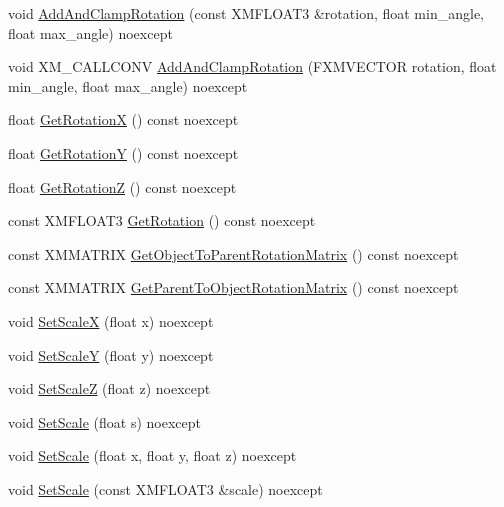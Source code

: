 \begin{DoxyCompactItemize}
\item 
void \hyperlink{structmage_1_1_transform_node_aa36f2d18ac2a1d34815149c8fc6e0eaa}{Add\+And\+Clamp\+Rotation} (const X\+M\+F\+L\+O\+A\+T3 \&rotation, float min\+\_\+angle, float max\+\_\+angle) noexcept
\item 
void X\+M\+\_\+\+C\+A\+L\+L\+C\+O\+NV \hyperlink{structmage_1_1_transform_node_a0dbde9ab6c68d8c3717c2d0f2dd5cc5c}{Add\+And\+Clamp\+Rotation} (F\+X\+M\+V\+E\+C\+T\+OR rotation, float min\+\_\+angle, float max\+\_\+angle) noexcept
\item 
float \hyperlink{structmage_1_1_transform_node_a590d811929ff63f0caa660036b4e74bb}{Get\+RotationX} () const noexcept
\item 
float \hyperlink{structmage_1_1_transform_node_aad37033c32302445a8bc0d93b655dae6}{Get\+RotationY} () const noexcept
\item 
float \hyperlink{structmage_1_1_transform_node_aba94c2995aae387542cd238d1df446f5}{Get\+RotationZ} () const noexcept
\item 
const X\+M\+F\+L\+O\+A\+T3 \hyperlink{structmage_1_1_transform_node_ae785911d718434387199a92c6966a9b7}{Get\+Rotation} () const noexcept
\item 
const X\+M\+M\+A\+T\+R\+IX \hyperlink{structmage_1_1_transform_node_a07d6171d757d2f7fbf0d2d59dbe531d9}{Get\+Object\+To\+Parent\+Rotation\+Matrix} () const noexcept
\item 
const X\+M\+M\+A\+T\+R\+IX \hyperlink{structmage_1_1_transform_node_a6a5c82910f5f6395a74bddf3d564547c}{Get\+Parent\+To\+Object\+Rotation\+Matrix} () const noexcept
\item 
void \hyperlink{structmage_1_1_transform_node_a16302153bf4256de026b9b5f32fe3b72}{Set\+ScaleX} (float x) noexcept
\item 
void \hyperlink{structmage_1_1_transform_node_a92e9ec18f1028a9884a3a7e00b68958f}{Set\+ScaleY} (float y) noexcept
\item 
void \hyperlink{structmage_1_1_transform_node_a2a9445f59648a7b5c2ab7a197617c909}{Set\+ScaleZ} (float z) noexcept
\item 
void \hyperlink{structmage_1_1_transform_node_aaa365d5baaadc9fa36c0ba96017eccfe}{Set\+Scale} (float s) noexcept
\item 
void \hyperlink{structmage_1_1_transform_node_aa1721a611f56fb73c72bb61941a9dc37}{Set\+Scale} (float x, float y, float z) noexcept
\item 
void \hyperlink{structmage_1_1_transform_node_a135418b2bdc0ebdfb12cb747ece38d48}{Set\+Scale} (const X\+M\+F\+L\+O\+A\+T3 \&scale) noexcept

\end{DoxyCompactItemize}
